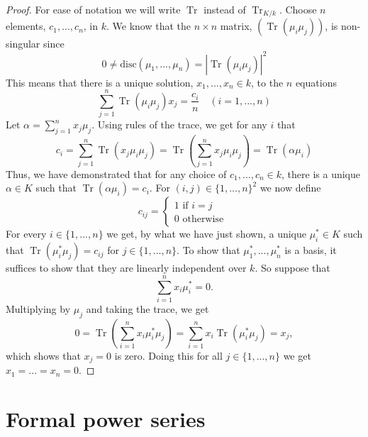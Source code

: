 \documentclass{article}
\DeclareMathOperator{\tr}{Tr}
\numberwithin{equation}{section}
\begin{document}
\begin{proof}
    For ease of notation we will write $\tr$ instead of $\tr_{K/k}$. Choose $n$ elements, $c_1, ..., c_n$, in $k$. We know that the $n \times n$ matrix, $(\tr (\mu_i \mu_j))$, is non-singular since $$0 \neq \text{disc}(\mu_1, ..., \mu_n) = |\tr(\mu_i \mu_j)|^2$$
    This means that there is a unique solution, $x_1, ..., x_n \in k$, to the $n$ equations
    $$\sum_{j=1}^n \tr(\mu_i \mu_j) x_j = \frac{c_i}{n} \quad (i = 1, ..., n)$$
    Let $\alpha = \sum_{j=1}^n x_j \mu_j$. Using rules of the trace, we get for any $i$ that
    $$c_i = \sum_{j=1}^n \tr(x_j \mu_i \mu_j) = \tr(\sum_{j=1}^n x_j \mu_i \mu_j) = \tr(\alpha \mu_i)$$
    Thus, we have demonstrated that for any choice of $c_1, ..., c_n \in k$, there is a unique $\alpha \in K$ such that $\tr(\alpha \mu_i)= c_i$. For $(i,j) \in \{1, ..., n\}^2$ we now define
    $$c_{ij} = \begin{cases*}
            1 \text{ if } i = j \\
            0 \text{ otherwise }
        \end{cases*}$$
    For every $i \in \{1, ..., n \}$ we get, by what we have just shown, a unique $\mu_i^* \in K$ such that $\tr(\mu_i^* \mu_j) = c_{ij}$ for $j \in \{ 1, ..., n \}$. To show that $\mu_1^*, ..., \mu_n^*$ is a basis, it suffices to show that they are linearly independent over $k$. So suppose that
    $$\sum_{i=1}^n x_i \mu_i^* = 0.$$
    Multiplying by $\mu_j$ and taking the trace, we get
    $$0 = \tr(\sum_{i=1}^n x_i \mu_i^* \mu_j) = \sum_{i=1}^n x_i \tr(\mu_i^* \mu_j) = x_j,$$
    which shows that $x_j = 0$ is zero. Doing this for all $j \in \{1, ..., n \}$ we get $x_1 = ... = x_n = 0$.
\end{proof}



\section{Formal power series}\label{sec: Formal power series}
\end{document}
